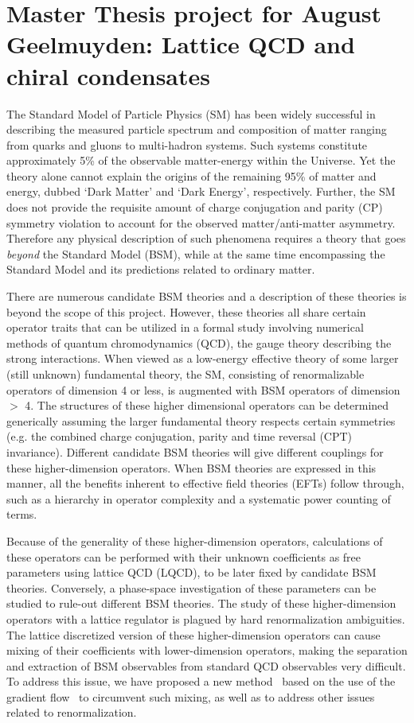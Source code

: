 \documentclass[aps,prc,twocolumn,showpacs,floatfix,nofootinbib,preprintnumbers,superscriptaddress,amsmath,amssymb]{revtex4-1}
\begin{document}
\pagestyle{plain}

\section*{Master Thesis project for August Geelmuyden: Lattice QCD and chiral condensates}

The Standard Model of Particle Physics (SM) has been widely successful in describing 
the measured particle spectrum and composition of matter ranging from quarks and gluons 
to multi-hadron systems.  Such systems constitute approximately 5\% of the observable 
matter-energy within the Universe.  Yet the theory alone cannot explain the origins of 
the remaining 95\% of matter and energy, dubbed `Dark Matter' and `Dark Energy', respectively.  
Further, the SM does not provide the requisite amount of charge conjugation and parity (CP) 
symmetry violation to account for the observed matter/anti-matter asymmetry.  Therefore any physical description of such 
phenomena requires a theory that goes \emph{beyond} the Standard Model (BSM), while at the 
same time encompassing the Standard Model and its predictions related to ordinary matter.

There are numerous candidate BSM theories and a description of these theories is 
beyond the scope of this project.  However, these theories all share certain operator 
traits that can be utilized in a formal study involving numerical methods of 
quantum chromodynamics (QCD), the gauge theory describing the strong interactions.  
When viewed as a low-energy effective theory of some larger (still unknown) fundamental theory, 
the SM, consisting of renormalizable operators of dimension 4 or less, 
is augmented with BSM operators of dimension $>$ 4.  The structures of these higher 
dimensional operators can be determined generically assuming the larger fundamental theory 
respects certain symmetries (e.g. the combined charge conjugation, parity and time reversal (CPT) invariance). 
Different candidate BSM theories will give different couplings for these higher-dimension operators.  When BSM theories 
are expressed in this manner, all the benefits inherent to effective field theories (EFTs) follow through, 
such as a hierarchy in operator complexity and a systematic power counting of terms.

Because of the generality of these higher-dimension operators, 
calculations of these operators can be performed with their unknown coefficients as free parameters using lattice QCD (LQCD), 
to be later fixed by candidate BSM theories.  
Conversely, a phase-space investigation of these parameters can be studied to rule-out different BSM theories.  
The study of these higher-dimension operators with a lattice regulator is plagued by 
hard renormalization ambiguities. 
The lattice discretized version of these higher-dimension operators can cause mixing of their coefficients 
with lower-dimension operators, making the separation and extraction of BSM observables from standard QCD observables very difficult.  
To address this issue, we have proposed a new method~\cite{Shindler:2014oha,Shindler:2015aqa} 
based on the use of the gradient flow~\cite{Luscher:2010iy,Luscher:2013cpa} 
to circumvent such mixing, as well as to address other issues related to renormalization.
\end{document}
